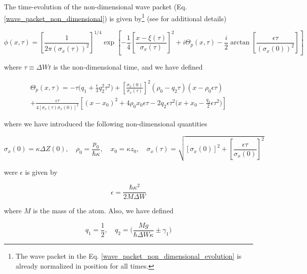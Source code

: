 \documentclass{article}
\begin{document}
The time-evolution of the non-dimensional wave packet (Eq. \ref{wave_packet_non_dimensional}) is given by\footnote{The wave packet in the Eq. \ref{wave_packet_non_dimensional_evolution} is already normalized in position for all times.} (see \cite{Castanos2014} for additional details)

\begin{equation}\label{wave_packet_non_dimensional_evolution}
\phi(x,\tau) = 
\left[\frac{1}{2 \pi (\sigma_{x}(\tau))^2} \right]^{1/4} \exp \left[-\frac{1}{4} \left[\frac{x-\xi(\tau)}{\sigma_{x}(\tau)}\right]^{2}  + i\Theta_{p}(x, \tau) - \frac{i}{2}\arctan\left[\frac{\epsilon \tau}{(\sigma_{x}(0))^{2}}\right] \right]
\end{equation}

where $\tau\equiv \Delta W t$ is the non-dimensional time, and we have defined 

\begin{multline}\label{theta_p}
\Theta_{p}(x,\tau) = -\tau \bigg(q_{1} + \frac{\epsilon}{3} q_{2}^{2} \tau^{2}\bigg) + \left[\frac{\sigma_{x}(0)}{\sigma_{x}(\tau)} \right]^{2} (\rho_{0} - q_{2} \tau)(x-\rho_{0} \epsilon \tau) \\
+ \frac{\epsilon \tau}{4 [\sigma_{x}(\tau)\sigma_{x}(0)]^{2}} \left[(x-x_{0})^{2} + 4\rho_{0} x_{0} \epsilon \tau -2q_{2} \epsilon \tau^{2} \bigg(x+x_{0}- \frac{q_{2}}{2} \epsilon \tau^{2} \bigg)\right]
\end{multline}

where we have introduced the following non-dimensional quantities

\begin{equation}\label{non_dimensional_definitions}
\sigma_{x}(0) = \kappa \Delta Z(0)\mathrm{,}\quad \rho_{0}=\frac{p_{0}}{\hbar \kappa} \mathrm{,}\quad 
x_{0}=\kappa z_{0} \mathrm{,}\quad 
\sigma_{x}(\tau) = \sqrt{[\sigma_{x}(0)]^{2} + \left[\frac{\epsilon \tau}{\sigma_{x}(0)} \right]^{2}}
\end{equation}

were $\epsilon$ is given by 

\begin{equation}\label{epsilon}
\epsilon = \frac{\hbar \kappa^{2}}{2 M \Delta W}
\end{equation}

where $M$ is the mass of the atom. Also, we have defined

\begin{equation}\label{q1_q2}
q_{1} = \frac{1}{2} \mathrm{,}\quad q_{2} = \bigg(\frac{M g}{\hbar \Delta W \kappa} \pm  \gamma_{1} \bigg)
\end{equation}
\end{document}
